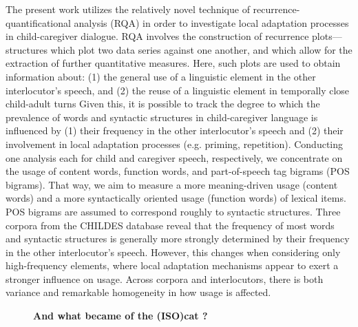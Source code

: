 \documentclass[10pt, a4paper, twopage, headinclude, footinclude, BCOR5mm]{scrartcl}
\begin{document}
        \begin{table}[t!]
    \end{table}

\noindent
The present work utilizes the relatively novel technique of recurrence-quantificational analysis (RQA) in order to investigate local adaptation processes in child-caregiver dialogue. RQA involves the construction of recurrence plots---structures which plot two data series against one another, and which allow for the extraction of further quantitative measures. Here, such plots are used to obtain information about:  (1) the general use of a linguistic element in the other interlocutor's speech, and (2) the reuse of a linguistic element in temporally close child-adult turns  Given this, it is possible to track the degree to which the prevalence of words and syntactic structures in child-caregiver language is influenced by (1) their frequency in the other interlocutor's speech and (2) their involvement in local adaptation processes (e.g. priming, repetition).  Conducting one analysis each for child and caregiver speech, respectively, we concentrate on the usage of content words, function words, and part-of-speech tag bigrams (POS bigrams). That way, we aim to measure a more meaning-driven usage (content words) and a more syntactically oriented usage (function words) of lexical items. POS bigrams are assumed to correspond roughly to syntactic structures.  Three corpora from the CHILDES database reveal that the frequency of most words and syntactic structures is generally more strongly determined by their frequency in the other interlocutor's speech. However, this changes when considering only high-frequency elements, where local adaptation mechanisms appear to exert a stronger influence on usage. Across corpora and interlocutors, there is both variance and remarkable homogeneity in how usage is affected.


\newpage

\begin{figure}[t!]
\centering
\large\textbf{And what became of the (ISO)cat ?}
\vspace*{0.5cm}
\end{figure}
\end{document}
